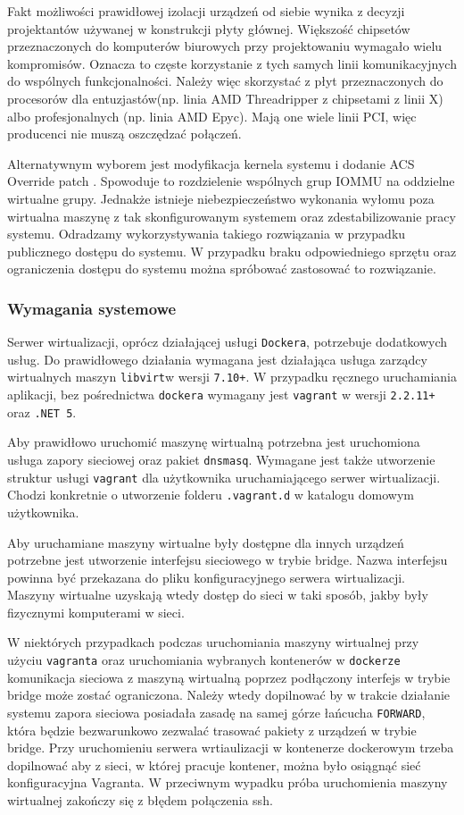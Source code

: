 \documentclass[../opis-rozwiazania.tex]{subfiles}
\begin{document}
Fakt możliwości prawidłowej izolacji urządzeń od siebie wynika z decyzji projektantów używanej w konstrukcji płyty głównej.
Większość chipsetów przeznaczonych do komputerów biurowych przy projektowaniu wymagało wielu kompromisów.
Oznacza to częste korzystanie z tych samych linii komunikacyjnych do wspólnych funkcjonalności.
Należy więc skorzystać z płyt przeznaczonych do procesorów dla entuzjastów(np. linia AMD Threadripper z chipsetami z linii X) albo profesjonalnych (np. linia AMD Epyc).
Mają one wiele linii PCI, więc producenci nie muszą oszczędzać połączeń.

Alternatywnym wyborem jest modyfikacja kernela systemu i dodanie ACS Override patch \parencite{acs-override}.
Spowoduje to rozdzielenie wspólnych grup IOMMU na oddzielne wirtualne grupy.
Jednakże istnieje niebezpieczeństwo wykonania wyłomu poza wirtualna maszynę z tak skonfigurowanym systemem oraz zdestabilizowanie pracy systemu.
Odradzamy wykorzystywania takiego rozwiązania w przypadku publicznego dostępu do systemu.
W przypadku braku odpowiedniego sprzętu oraz ograniczenia dostępu do systemu można spróbować zastosować to rozwiązanie.

\subsubsection{Wymagania systemowe}
Serwer wirtualizacji, oprócz działającej usługi \texttt{Dockera}, potrzebuje dodatkowych usług.
Do prawidłowego działania wymagana jest działająca usługa zarządcy wirtualnych maszyn \texttt{libvirt}w wersji \texttt{7.10+}. W przypadku ręcznego uruchamiania aplikacji, bez pośrednictwa \texttt{dockera} wymagany jest \texttt{vagrant} w wersji \texttt{2.2.11+} oraz \texttt{.NET 5}.

Aby prawidłowo uruchomić maszynę wirtualną potrzebna jest uruchomiona usługa zapory sieciowej oraz pakiet \texttt{dnsmasq}.
Wymagane jest także utworzenie struktur usługi \texttt{vagrant} dla użytkownika uruchamiającego serwer wirtualizacji.
Chodzi konkretnie o utworzenie folderu \texttt{.vagrant.d} w katalogu domowym użytkownika.

Aby uruchamiane maszyny wirtualne były dostępne dla innych urządzeń potrzebne jest utworzenie interfejsu sieciowego w trybie bridge.
Nazwa interfejsu powinna być przekazana do pliku konfiguracyjnego serwera wirtualizacji.
Maszyny wirtualne uzyskają wtedy dostęp do sieci w taki sposób, jakby były fizycznymi komputerami w sieci.

W niektórych przypadkach podczas uruchomiania maszyny wirtualnej przy użyciu \texttt{vagranta} oraz uruchomiania wybranych kontenerów w \texttt{dockerze} komunikacja sieciowa z maszyną wirtualną poprzez podłączony interfejs w trybie bridge może zostać ograniczona.
Należy wtedy dopilnować by w trakcie działanie systemu zapora sieciowa posiadała zasadę na samej górze łańcucha \texttt{FORWARD}, która będzie bezwarunkowo zezwalać trasować pakiety z urządzeń w trybie bridge.
Przy uruchomieniu serwera wrtiaulizacji w kontenerze dockerowym trzeba dopilnować aby z sieci, w której pracuje kontener, można było osiągnąć sieć konfiguracyjna Vagranta.
W przeciwnym wypadku próba uruchomienia maszyny wirtualnej zakończy się z błędem połączenia ssh.
\end{document}

